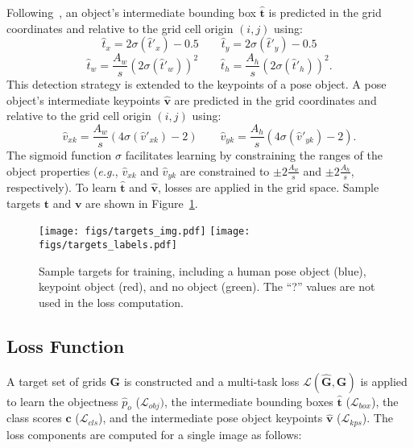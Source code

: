 \documentclass[runningheads]{llncs}
\newcommand{\eg}{\textit{e.g.}}
\newcommand\hlll[1]{\bgroup
  \hskip0pt\color{black}#1\egroup
}
\begin{document}
Following~\cite{glenn_jocher_2021_4679653, wang2020scaled}, an object's intermediate bounding box $\hat{\mathbf{t}}$ is predicted in the grid coordinates and relative to the grid cell origin $(i, j)$ using:
\begin{equation}
    \hat{t}_x = 2\sigma(\hat{t}'_x) - 0.5 \quad\quad \hat{t}_y = 2\sigma(\hat{t}'_y) - 0.5
\end{equation}
\begin{equation}
    \hat{t}_w = \frac{A_w}{s}(2\sigma(\hat{t}'_w))^2 \quad\quad \hat{t}_h = \frac{A_h}{s}(2\sigma(\hat{t}'_h))^2.
\end{equation}
This detection strategy \hlll {is} extended to the keypoints of a pose object. A pose object's intermediate keypoints $\hat{\mathbf{v}}$ are predicted in the grid coordinates and relative to the grid cell origin $(i, j)$ using:
\begin{equation}
    \hat{v}_{xk} = \frac{A_w}{s}(4\sigma(\hat{v}'_{xk}) - 2) \quad\quad \hat{v}_{yk} = \frac{A_h}{s}(4\sigma(\hat{v}'_{yk}) - 2).
\end{equation}
The sigmoid function $\sigma$ facilitates learning by constraining the ranges of the object properties (\eg, $\hat{v}_{xk}$ and $\hat{v}_{yk}$ are constrained to $\pm2\frac{A_w}{s}$ and $\pm2\frac{A_h}{s}$, respectively). To learn $\hat{\mathbf{t}}$ and $\hat{\mathbf{v}}$, losses are applied in the grid space. Sample targets $\mathbf{t}$ and $\mathbf{v}$ are shown in Figure~\ref{fig:kapao_targets}.

\begin{figure}[t!]
\centering
    \texttt{[image: figs/targets\_img.pdf]}
    \texttt{[image: figs/targets\_labels.pdf]}
\caption[Sample targets used for training KAPAO.]{Sample targets for training, including a human pose object (blue), keypoint object (red), and no object (green). The ``?'' values are not used in the loss computation.}
\label{fig:kapao_targets}
\end{figure}

\subsection{Loss Function}
\label{sec:kapao_loss}
A target set of grids $\mathbf{G}$ is constructed and a multi-task loss $\mathcal{L}(\hat{\mathbf{G}}, \mathbf{G})$ is applied to learn the objectness $\hat{p}_o$ ($\mathcal{L}_{obj})$, the intermediate bounding boxes $\hat{\textbf{t}}$ ($\mathcal{L}_{box}$), the class scores $\hat{\mathbf{c}}$ ($\mathcal{L}_{cls}$), and the intermediate pose object keypoints $\hat{\mathbf{v}}$ ($\mathcal{L}_{kps}$). The loss components are computed for a single image as follows:
\end{document}
